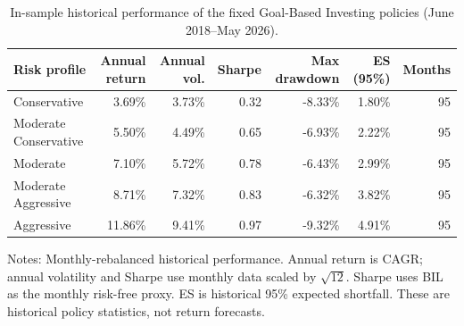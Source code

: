 \begin{table}[htbp]
\centering
\footnotesize
\caption{In-sample historical performance of the fixed Goal-Based Investing policies (June 2018--May 2026).}
\label{tab:gbi-policy-performance}
\begin{tabular}{lrrrrrr}
\toprule
Risk profile & Annual return & Annual vol. & Sharpe & Max drawdown & ES (95\%) & Months \\
\midrule
Conservative & 3.69\% & 3.73\% & 0.32 & -8.33\% & 1.80\% & 95 \\
Moderate Conservative & 5.50\% & 4.49\% & 0.65 & -6.93\% & 2.22\% & 95 \\
Moderate & 7.10\% & 5.72\% & 0.78 & -6.43\% & 2.99\% & 95 \\
Moderate Aggressive & 8.71\% & 7.32\% & 0.83 & -6.32\% & 3.82\% & 95 \\
Aggressive & 11.86\% & 9.41\% & 0.97 & -9.32\% & 4.91\% & 95 \\
\bottomrule
\end{tabular}
\vspace{2pt}
\begin{minipage}{0.96\linewidth}
\footnotesize
Notes: Monthly-rebalanced historical performance. Annual return is CAGR; annual volatility and Sharpe use monthly data scaled by $\sqrt{12}$. Sharpe uses BIL as the monthly risk-free proxy. ES is historical 95\% expected shortfall. These are historical policy statistics, not return forecasts.
\end{minipage}
\end{table}
